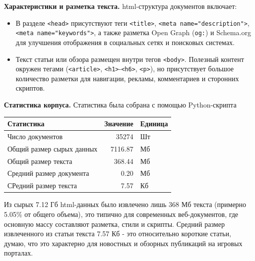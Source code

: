 \vspace{1 em}
\noindent\textbf{Характеристики и разметка текста.} html-структура документов включает:
\begin{itemize}
    \item В разделе \texttt{<head>} присутствуют теги \texttt{<title>}, \texttt{<meta name="description">}, \texttt{<meta name="keywords">}, а также разметка Open Graph (\texttt{og:}) и Schema.org для улучшения отображения в социальных сетях и поисковых системах.
    \item Текст статьи или обзора размещен внутри тегов \texttt{<body>}. Полезный контент окружен тегами (\texttt{<article>}, \texttt{<h1>}-\texttt{<h6>}, \texttt{<p>}), но присутствует большое количество разметки для навигации, рекламы, комментариев и сторонних скриптов.    
\end{itemize}

\vspace{1 em}
\noindent\textbf{Статистика корпуса.} Статистика была собрана с помощью Python-скрипта

\begin{table}[h]
\centering
\begin{tabular}{|l|r|l|}
\hline
Статистика & Значение & Единица \\
\hline
Число документов & 35274 & Шт \\
\hline
Общий размер сырых данных & 7116.87 & Мб \\
\hline
Общий размер текста & 368.44 & Мб \\
\hline
Средний размер документа & 0.20 & Мб \\
\hline
СРедний размер текста & 7.57 & Кб \\
\hline
\end{tabular}
\end{table}

Из сырых 7.12 Гб html-данных было извлечено лишь 368 Мб текста (примерно 5.05\% от общего объема), это типично для современных веб-документов, где основную массу составляют разметка, стили и скрипты. Средний размер извлеченного из статьи текста 7.57 Кб - это относительно короткие статьи, думаю, что это характерно для новостных и обзорных публикаций на игровых порталах.



\pagebreak

